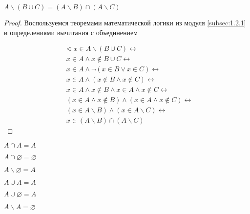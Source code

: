 \begin{theorem}
    $A \backslash (B \cup C) = (A \backslash B) \cap (A \backslash C)$
\end{theorem}

\begin{proof}
    Воспользуемся теоремами математической логики из модуля \ref{subsec:1.2.1} и определениями вычитания с объединением

    \begin{align*}
        & \sphericalangle \; x \in A \backslash (B \cup C) \leftrightarrow \\
        & x \in A \land x \notin B \cup C \leftrightarrow \\
        & x \in A \land \neg (x \in B \lor x \in C) \leftrightarrow \\
        & x \in A \land (x \notin B \land x \notin C) \leftrightarrow \\
        & x \in A \land x \notin B \land x \in A \land x \notin C \leftrightarrow \\
        & (x \in A \land x \notin B) \land (x \in A \land x \notin C) \leftrightarrow \\
        & (x \in A \backslash B) \land (x \in A \backslash C) \leftrightarrow \\
        & x \in (A \backslash B) \cap (A \backslash C)
    \end{align*}
\end{proof}

\begin{theorem}
    $A \cap A = A$
\end{theorem}

\begin{theorem}
    $A \cap \varnothing = \varnothing$
\end{theorem}

\begin{theorem}
    $A \backslash \varnothing = A$
\end{theorem}

\begin{theorem}
    $A \cup A = A$
\end{theorem}

\begin{theorem}
    $A \cup \varnothing = A$
\end{theorem}

\begin{theorem}
    $A \backslash A = \varnothing$
\end{theorem}

\newpage
